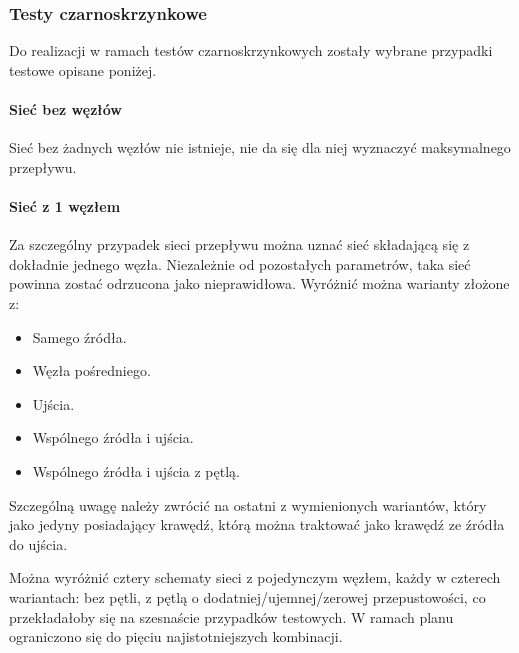 \subsubsection{Testy czarno\dywiz skrzynkowe}
Do realizacji w ramach testów czarnoskrzynkowych zostały wybrane przypadki testowe opisane poniżej.

\paragraph{Sieć bez węzłów}
Sieć bez żadnych węzłów nie istnieje, nie da się dla niej wyznaczyć maksymalnego
przepływu.

\paragraph{Sieć z 1 węzłem}
Za szczególny przypadek sieci przepływu można uznać sieć składającą się z
dokładnie jednego węzła. Niezależnie od pozostałych parametrów, taka sieć
powinna zostać odrzucona jako nieprawidłowa. Wyróżnić można warianty złożone z:
\begin{itemize}[nosep]
    \item Samego źródła.
    \item Węzła pośredniego.
    \item Ujścia.
    \item Wspólnego źródła i ujścia.
    \item Wspólnego źródła i ujścia z pętlą.
\end{itemize}
Szczególną uwagę należy zwrócić na ostatni z wymienionych wariantów, który jako
jedyny posiadający krawędź, którą można traktować jako krawędź ze źródła do
ujścia.

Można wyróżnić cztery schematy sieci z pojedynczym węzłem, każdy w czterech
wariantach: bez pętli, z pętlą o dodatniej/ujemnej/zerowej przepustowości, co
przekładałoby się na szesnaście przypadków testowych. W ramach planu ograniczono
się do pięciu najistotniejszych kombinacji.

